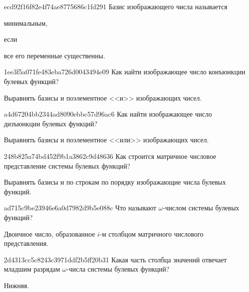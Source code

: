 \begin{note}{ecd92f16f82e4f74ae8775686c1fd291}
    Базис изображающего числа называется \begin{icloze}{2}минимальным,\end{icloze} если \begin{icloze}{1}все его переменные существенны.\end{icloze}
\end{note}

\begin{note}{1ee3f5a071fe483eba726d0043494e09}
    Как найти изображающее число конъюнкции булевых функций?

    \begin{cloze}{1}
        Выравнять базисы и поэлементное <<и>> изображающих чисел.
    \end{cloze}
\end{note}

\begin{note}{a4d67204bb2344ad8090ebbc57d96ac6}
    Как найти изображающее число дизъюнкции булевых функций?

    \begin{cloze}{1}
        Выравнять базисы и поэлементное <<или>> изображающих чисел.
    \end{cloze}
\end{note}

\begin{note}{248b825a74bd452f9b1a3862c9d48636}
    Как строится матричное числовое представление системы булевых функций?

    \begin{cloze}{1}
        Выравнять базисы и по строкам по порядку изображающие числа булевых функций.
    \end{cloze}
\end{note}

\begin{note}{ad715c9be23946e6a0d7982d9b5e088c}
    Что называют \({ \omega }\)-числом системы булевых функций?

    \begin{cloze}{1}
        Двоичное число, образованное \({ i }\)-м столбцом матричного числового представления.
    \end{cloze}
\end{note}

\begin{note}{2d4313cc5c8243c3971ddf2b5ff20b31}
    Какая часть столбца значений отвечает младшим разрядам \({ \omega }\)-числа системы булевых функций?

    \begin{cloze}{1}
        Нижняя.
    \end{cloze}
\end{note}

